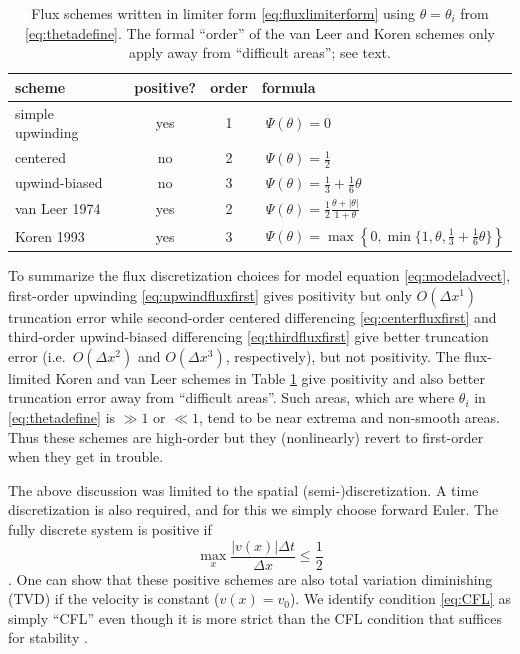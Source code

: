 \documentclass[11pt,final]{amsart}
\begin{document}
\begin{table}[ht]
  \centering
  \caption{Flux schemes written in limiter form \eqref{eq:fluxlimiterform} using $\theta=\theta_i$ from \eqref{eq:thetadefine}. The formal ``order'' of the van Leer and Koren schemes only apply away from  ``difficult areas''; see text.}
  \begin{tabular}{lccl}
    \textbf{scheme} & \textbf{positive?} & \textbf{order} & \textbf{formula} \\
\hline
    simple upwinding & yes & 1 & $\phantom{\Big|}\Psi(\theta) = 0$ \\
    centered         & no  & 2 & $\phantom{\Big|}\Psi(\theta) = \frac{1}{2}$  \\
    upwind-biased    & no  & 3 & $\phantom{\Big|}\Psi(\theta) = \frac{1}{3}+\frac{1}{6} \theta$  \\
    van Leer 1974    & yes & 2 & $\phantom{\Big|}\Psi(\theta) = \frac{1}{2} \frac{\theta + |\theta|}{1+\theta}$  \\
    Koren 1993       & yes & 3 & $\phantom{\Big|}\Psi(\theta) = \max\left\{0,\min\{1,\theta,\frac{1}{3}+\frac{1}{6} \theta\}\right\}$  \\
    \hline
  \end{tabular}
 \label{tab:fluxlimiters}
\end{table}

To summarize the flux discretization choices for model equation \eqref{eq:modeladvect}, first-order upwinding \eqref{eq:upwindfluxfirst} gives positivity but only $O(\Delta x^1)$ truncation error while second-order centered differencing \eqref{eq:centerfluxfirst} and third-order upwind-biased differencing \eqref{eq:thirdfluxfirst} give better truncation error (i.e.~$O(\Delta x^2)$ and $O(\Delta x^3)$, respectively), but not positivity.  The flux-limited Koren and van Leer schemes in Table \ref{tab:fluxlimiters} give positivity and also better truncation error away from ``difficult areas''.  Such areas, which are where $\theta_i$ in \eqref{eq:thetadefine} is $\gg 1$ or $\ll 1$, tend to be near extrema and non-smooth areas.  Thus these schemes are high-order but they (nonlinearly) revert to first-order when they get in trouble.

The above discussion was limited to the spatial (semi-)discretization.  A time discretization is also required, and for this we simply choose forward Euler.  The fully discrete system is positive if
\begin{equation}
\max_x \frac{|v(x)|\Delta t}{\Delta x} \le \frac{1}{2} \label{eq:CFL}
\end{equation}
\citep[section III.1.1]{HundsdorferVerwer2010}.  One can show that these positive schemes are also total variation diminishing (TVD) if the velocity is constant ($v(x)=v_0$).  We identify condition \eqref{eq:CFL} as simply ``CFL'' even though it is more strict than the CFL condition that suffices for stability \citep{MortonMayers}.
\end{document}
